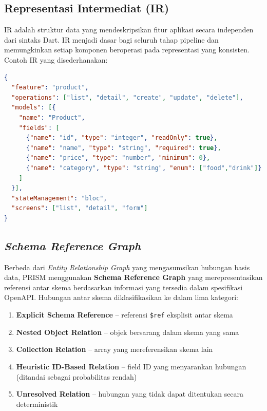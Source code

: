 \subsection{Representasi Intermediat (IR)}

IR adalah struktur data yang mendeskripsikan fitur aplikasi secara independen dari sintaks Dart. IR menjadi dasar bagi seluruh tahap pipeline dan memungkinkan setiap komponen beroperasi pada representasi yang konsisten. Contoh IR yang disederhanakan:

\begin{lstlisting}[language=json]
{
  "feature": "product",
  "operations": ["list", "detail", "create", "update", "delete"],
  "models": [{
    "name": "Product",
    "fields": [
      {"name": "id", "type": "integer", "readOnly": true},
      {"name": "name", "type": "string", "required": true},
      {"name": "price", "type": "number", "minimum": 0},
      {"name": "category", "type": "string", "enum": ["food","drink"]}
    ]
  }],
  "stateManagement": "bloc",
  "screens": ["list", "detail", "form"]
}
\end{lstlisting}

\subsection{\textit{Schema Reference Graph}}

Berbeda dari \textit{Entity Relationship Graph} yang mengasumsikan hubungan basis data, PRISM menggunakan \textbf{Schema Reference Graph} yang merepresentasikan referensi antar skema berdasarkan informasi yang tersedia dalam spesifikasi OpenAPI. Hubungan antar skema diklasifikasikan ke dalam lima kategori:

\begin{enumerate}
    \item \textbf{Explicit Schema Reference} -- referensi \texttt{\$ref} eksplisit antar skema
    \item \textbf{Nested Object Relation} -- objek bersarang dalam skema yang sama
    \item \textbf{Collection Relation} -- array yang mereferensikan skema lain
    \item \textbf{Heuristic ID-Based Relation} -- field ID yang menyarankan hubungan (ditandai sebagai probabilitas rendah)
    \item \textbf{Unresolved Relation} -- hubungan yang tidak dapat ditentukan secara deterministik
\end{enumerate}

